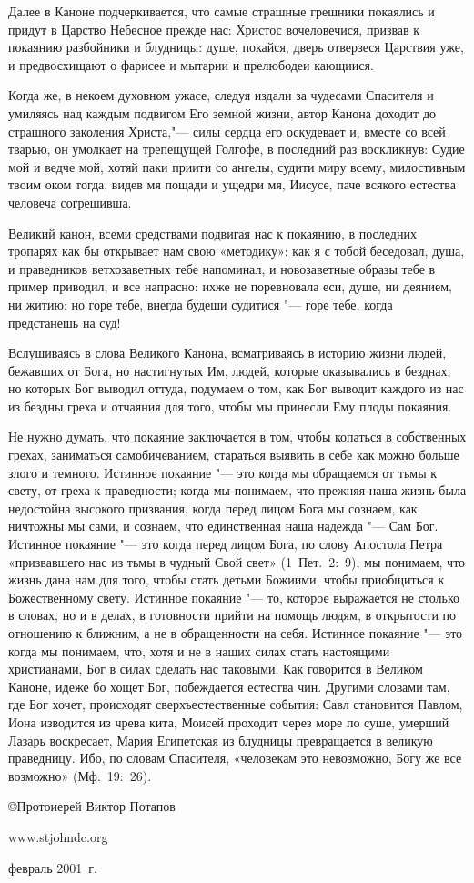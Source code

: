 \begin{mymulticols}
Далее в Каноне подчеркивается, что самые страшные грешники покаялись и придут в Царство Небесное прежде нас: Христос вочеловечися, призвав к покаянию разбойники и блудницы: душе, покайся, дверь отверзеся Царствия уже, и предвосхищают о фарисее и мытарии и прелюбодеи кающиися.

Когда же, в некоем духовном ужасе, следуя издали за чудесами Спасителя и умиляясь над каждым подвигом Его земной жизни, автор Канона доходит до страшного заколения Христа,"--- силы сердца его оскудевает и, вместе со всей тварью, он умолкает на трепещущей Голгофе, в последний раз воскликнув: Судие мой и ведче мой, хотяй паки приити со ангелы, судити миру всему, милостивным твоим оком тогда, видев мя пощади и ущедри мя, Иисусе, паче всякого естества человеча согрешивша.

Великий канон, всеми средствами подвигая нас к покаянию, в последних тропарях как бы открывает нам свою «методику»: как я с тобой беседовал, душа, и праведников ветхозаветных тебе напоминал, и новозаветные образы тебе в пример приводил, и все напрасно: ихже не поревновала еси, душе, ни деянием, ни житию: но горе тебе, внегда будеши судитися "--- горе тебе, когда предстанешь на суд!

Вслушиваясь в слова Великого Канона, всматриваясь в историю жизни людей, бежавших от Бога, но настигнутых Им, людей, которые оказывались в безднах, но которых Бог выводил оттуда, подумаем о том, как Бог выводит каждого из нас из бездны греха и отчаяния для того, чтобы мы принесли Ему плоды покаяния.

Не нужно думать, что покаяние заключается в том, чтобы копаться в собственных грехах, заниматься самобичеванием, стараться выявить в себе как можно больше злого и темного. Истинное покаяние "--- это когда мы обращаемся от тьмы к свету, от греха к праведности; когда мы понимаем, что прежняя наша жизнь была недостойна высокого призвания, когда перед лицом Бога мы сознаем, как ничтожны мы сами, и сознаем, что единственная наша надежда "--- Сам Бог. Истинное покаяние "--- это когда перед лицом Бога, по слову Апостола Петра «призвавшего нас из тьмы в чудный Свой свет» (1~Пет.~2:~9), мы понимаем, что жизнь дана нам для того, чтобы стать детьми Божиими, чтобы приобщиться к Божественному свету. Истинное покаяние "--- то, которое выражается не столько в словах, но и в делах, в готовности прийти на помощь людям, в открытости по отношению к ближним, а не в обращенности на себя. Истинное покаяние "--- это когда мы понимаем, что, хотя и не в наших силах стать настоящими христианами, Бог в силах сделать нас таковыми. Как говорится в Великом Каноне, идеже бо хощет Бог, побеждается естества чин. Другими словами там, где Бог хочет, происходят сверхъестественные события: Савл становится Павлом, Иона изводится из чрева кита, Моисей проходит через море по суше, умерший Лазарь воскресает, Мария Египетская из блудницы превращается в великую праведницу. Ибо, по словам Спасителя, «человекам это невозможно, Богу же все возможно» (Мф.~19:~26).

©Протоиерей Виктор Потапов

www.stjohndc.org

февраль 2001~г.

\end{mymulticols}

